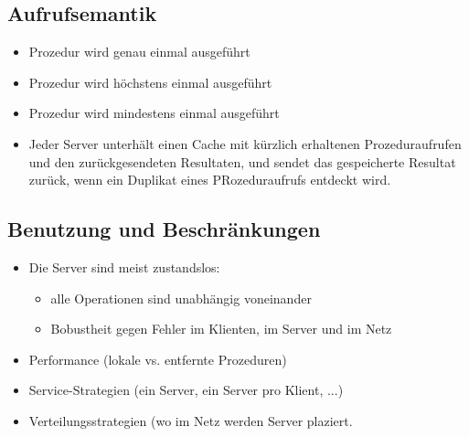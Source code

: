 \documentclass[10pt]{article}
\begin{document}
\subsection{Aufrufsemantik}
\begin{itemize}
	\item Prozedur wird genau einmal ausgeführt
	\item Prozedur wird höchstens einmal ausgeführt
	\item Prozedur wird mindestens einmal ausgeführt
	\item Jeder Server unterhält einen Cache mit kürzlich erhaltenen Prozeduraufrufen und den zurückgesendeten Resultaten, und sendet das gespeicherte Resultat zurück, wenn ein Duplikat eines PRozeduraufrufs entdeckt wird.
\end{itemize}

\subsection{Benutzung und Beschränkungen}
\begin{itemize}
	\item Die Server sind meist zustandslos:
		\begin{itemize}
			\item alle Operationen sind unabhängig voneinander
			\item Bobustheit gegen Fehler im Klienten, im Server und im Netz
		\end{itemize}
	\item Performance (lokale vs. entfernte Prozeduren)
	\item Service-Strategien (ein Server, ein Server pro Klient, ...)
	\item Verteilungsstrategien (wo im Netz werden Server plaziert.
\end{itemize}
\end{document}
